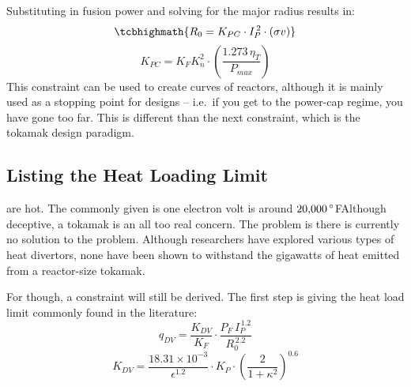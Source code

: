 Substituting in fusion power and solving for the major radius results in:
\begin{equation}
	\label{eq:r_pcap}
	\tcbhighmath{ R_0 = K_{PC} \cdot I_P^{\,2} \cdot (\sigma v) }
\end{equation} 
\begin{equation}
	K_{PC} = K_F K_n^2 \cdot \left( \frac{ 1.273 \, \eta_T }{ P_{max} } \right)
\end{equation} 
This  constraint can be used to create curves of reactors, although it is mainly used as a stopping point for designs -- i.e.\ if you get to the power-cap regime, you have gone too far. This is different than the next constraint, which is  the  tokamak design paradigm.
\subsection{Listing the Heat Loading Limit}

 are hot. The commonly given  is one electron volt is around $20\textnormal{,}000 \, {}^\circ$FAlthough  deceptive,  a tokamak is an all too real concern. The problem is there is currently no solution to the problem. Although researchers have explored various types of heat divertors, none have been shown to withstand the gigawatts of heat emitted from a reactor-size tokamak.

 For  though, a  constraint will still be derived. The first step is giving the heat load limit commonly found in the literature: \cite{minervini}
\begin{equation}
  q_{DV} = \frac{ K_{DV} }{ K_F} \cdot \frac{ P_F \, I_P^{\,1.2} }{ R_0^{\,2.2} }
\end{equation}
\begin{equation}
	K_{DV} = \frac{18.31 \times 10^{-3}}{\epsilon^{1.2}} \cdot K_P \cdot \left( \frac{2}{1+\kappa^2} \right) ^ {0.6}
\end{equation}

